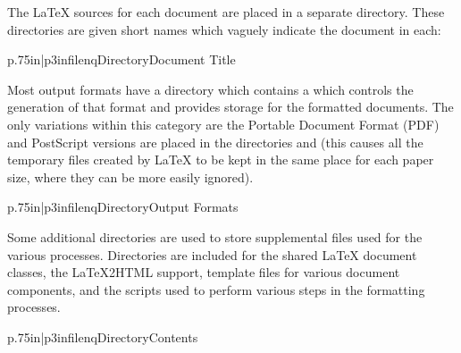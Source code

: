 \documentclass{howto}
\begin{document}
  \begin{definitions}
	The \LaTeX{} sources for each document are placed in a
	separate directory.  These directories are given short
	names which vaguely indicate the document in each:

	\begin{tableii}{p{.75in}|p{3in}}{filenq}{Directory}{Document Title}
            {}
            {}
            {}
            {}
            {}
            {}
            {}
            {}
            {}
	\end{tableii}

	Most output formats have a directory which contains a
	 which controls the generation of that format
	and provides storage for the formatted documents.  The only
	variations within this category are the Portable Document
        Format (PDF) and PostScript versions are placed in the
	directories  and  (this
	causes all the temporary files created by \LaTeX{} to be kept
	in the same place for each paper size, where they can be more
	easily ignored).

	\begin{tableii}{p{.75in}|p{3in}}{filenq}{Directory}{Output Formats}
	\end{tableii}

	Some additional directories are used to store supplemental
	files used for the various processes.  Directories are
	included for the shared \LaTeX{} document classes, the
	\LaTeX2HTML support, template files for various document
	components, and the scripts used to perform various steps in
	the formatting processes.

	\begin{tableii}{p{.75in}|p{3in}}{filenq}{Directory}{Contents}
	\end{tableii}

  \end{definitions}
\end{document}
